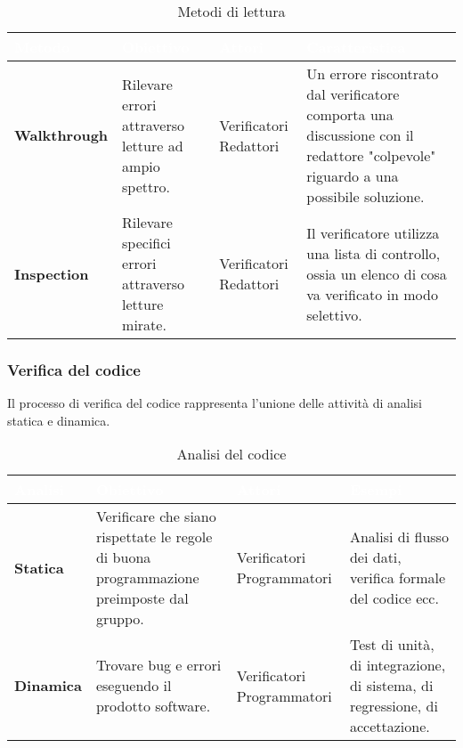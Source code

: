 \renewcommand{\arraystretch}{1.5}
\renewcommand\extrarowheight{1.5pt}
\begin{longtable}{C{3cm} | C{4cm} C{4cm} C{5cm}}
		\caption{Metodi di lettura} \\
		\textcolor{white}{\textbf{Metodo}} & 
		\textcolor{white}{\textbf{Obiettivo}} & 
		\textcolor{white}{\textbf{Attori}} & 
		\textcolor{white}{\textbf{Caratteristica}} \\
		\endfirsthead
		\hline
		\textbf{Walkthrough} & 
		Rilevare errori attraverso letture ad ampio spettro. & 
		Verificatori \newline Redattori & 
		Un errore riscontrato dal verificatore comporta una discussione con il redattore "colpevole" riguardo a una possibile soluzione. \\
		\textbf{Inspection} & 
		Rilevare specifici errori attraverso letture mirate. & 
		Verificatori \newline Redattori & 
		Il verificatore utilizza una lista di controllo, ossia un elenco di cosa va verificato in modo selettivo. \\
\end{longtable}

\subsubsection{Verifica del codice}
Il processo di verifica del codice rappresenta l'unione delle attività di analisi statica e dinamica. 

\renewcommand{\arraystretch}{1.5}
\renewcommand\extrarowheight{1.5pt}
\begin{longtable}{C{3cm} | C{4cm} C{4cm} C{5cm}}
		\caption{Analisi del codice} \\
		\textcolor{white}{\textbf{Analisi}} & 
		\textcolor{white}{\textbf{Obiettivo}} & 
		\textcolor{white}{\textbf{Attori}} & 
		\textcolor{white}{\textbf{Esempi}} \\
		\endfirsthead
		\hline
		\textbf{Statica} & 
		Verificare che siano rispettate le regole di buona programmazione preimposte dal gruppo. & 
		Verificatori \newline Programmatori & 
		Analisi di flusso dei dati, verifica formale del codice ecc. \\
		\textbf{Dinamica} & 
		Trovare bug e errori eseguendo il prodotto software.  & 
		Verificatori \newline Programmatori & 
		Test di unità, di integrazione, di sistema, di regressione, di accettazione. \\
\end{longtable}

